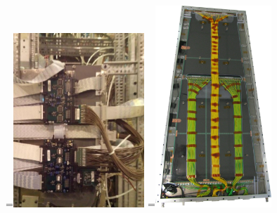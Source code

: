 \begin{figure}[ht]
	\centering
	=\hbox{\includegraphics[width=0.44\textwidth]{GLA/FEBplexis.png}}%
	=\hbox{\includegraphics[width=0.39\textwidth]{GLA/ChamberFloat.png}}%
	{\,} \hfill
	 \hfill

\end{figure}
